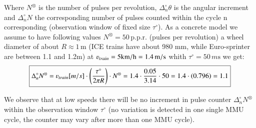 Where $N^\otimes$ is the number of pulses per revolution, $\Delta^\circ_n \theta$ is the angular increment and $\Delta^\circ_n N$ the corresponding number of pulses counted within the cycle n corresponding (observation window of fixed size $\tau^\circ$).  As a concrete model we assume to have following values $ N^\otimes = 50 \,\mathrm{p.p.r.} $ (pulses per revolution) a wheel diameter of about $ R \approx 1\, \mathrm{m}$ (ICE trains have about 980 mm, while Euro-sprinter are between 1.1 and 1.2m) at $\varv_{train} = 5 \mathrm{km/h}=1.4 \,\mathrm{m/s}$
whith $\tau^\circ=50 \, m\mathrm{s}$ we get:
\begin{equation}
\boxed{
\Delta_n^\circ N^{\otimes}= \varv_{train}[m/s]\cdot \left(\frac{\tau^\circ}{2\pi R}\right)\cdot N^\otimes=1.4\cdot\frac{0.05}{3.14}\cdot 50 = 1.4\cdot \left(0.796\right) =1.1 }
\end{equation}

We observe that at low speeds there will be no increment in pulse counter $\Delta^\circ_n N^\otimes$ within the observation window $\tau^\circ$ (no variation is detected in one single \gls{MMU} cycle, the counter may vary after more than one \gls{MMU} cycle).

